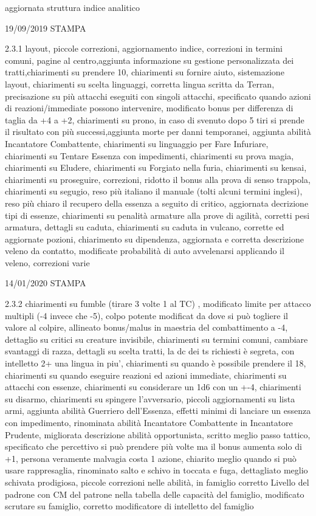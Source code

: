 \documentclass[a4paper,11pt,twoside,openany]{book}
\begin{document}
{aggiornata struttura indice analitico

	19/09/2019 STAMPA

	2.3.1 layout, piccole correzioni, aggiornamento indice, correzioni in termini comuni, pagine al centro,aggiunta informazione su gestione personalizzata dei tratti,chiarimenti su prendere 10, chiarimenti su fornire aiuto, sistemazione layout, chiarimenti su scelta linguaggi, corretta lingua scritta da Terran, precisazione su più attacchi eseguiti con singoli attacchi, specificato quando azioni di reazioni/immediate possono intervenire, modificato bonus per differenza di taglia da +4 a +2, chiarimenti su prono, in caso di svenuto dopo 5 tiri si prende il risultato con più successi,aggiunta morte per danni temporanei, aggiunta abilità Incantatore Combattente, chiarimenti su linguaggio per Fare Infuriare, chiarimenti su Tentare Essenza con impedimenti, chiarimenti su prova magia, chiarimenti su Eludere, chiarimenti su Forgiato nella furia, chiarimenti su kensai, chiarimenti su proseguire, correzioni, ridotto il bonus alla prova di senso trappola, chiarimenti su segugio, reso più italiano il manuale (tolti alcuni termini inglesi), reso più chiaro il recupero della essenza a seguito di critico, aggiornata decrizione tipi di essenze, chiarimenti su penalità armature alla prove di agilità, corretti pesi armatura, dettagli su caduta, chiarimenti su caduta in vulcano, corrette ed aggiornate pozioni, chiarimento su dipendenza, aggiornata e corretta descrizione veleno da contatto, modificate probabilità di auto avvelenarsi applicando il veleno, correzioni varie

	14/01/2020 STAMPA

	2.3.2 chiarimenti su fumble (tirare 3 volte 1 al TC) , modificato limite per attacco multipli (-4 invece che -5), colpo potente modificat da dove si può togliere il valore al colpire, allineato bonus/malus in maestria del combattimento a -4, dettaglio su critici su creature invisibile, chiarimenti su termini comuni, cambiare svantaggi di razza, dettagli su scelta tratti, la dc dei ts richiesti è segreta, con intelletto 2+ una lingua in piu', chiarimenti su quando è possibile prendere il 18, chiarimenti su quando eseguire reazioni ed azioni immediate, chiarimenti su attacchi con essenze, chiarimenti su considerare un 1d6 con un +-4, chiarimenti su disarmo, chiarimenti su spingere l'avversario, piccoli aggiornamenti su lista armi, aggiunta abilità Guerriero dell'Essenza, effetti minimi di lanciare un essenza con impedimento, rinominata abilità Incantatore Combattente in Incantatore Prudente, migliorata descrizione abilità opportunista, scritto meglio passo tattico, specificato che percettivo si può prendere più volte ma il bonus aumenta solo di +1, persona veramente malvagia costa 1 azione, chiarito meglio quando si può usare rappresaglia, rinominato salto e schivo in toccata e fuga, dettagliato meglio schivata prodigiosa, piccole correzioni nelle abilità, in famiglio corretto Livello del padrone con CM del patrone nella tabella delle capacità del famiglio, modificato scrutare su famiglio, corretto modificatore di intelletto del famiglio

}
\end{document}
